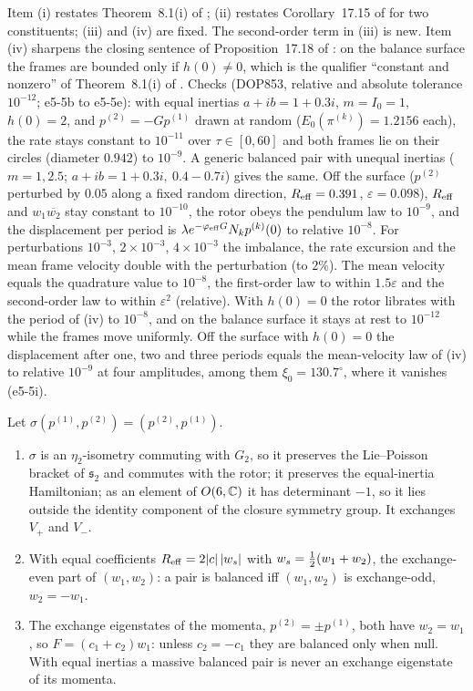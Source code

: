 Item (i) restates Theorem~8.1(i) of \cite{RE}; (ii) restates Corollary~17.15 of \cite{ES17} for two constituents; (iii) and (iv) are fixed. The
second-order term in (iii) is new. Item (iv) sharpens the closing sentence of Proposition~17.18 of \cite{ES17}: on the balance surface the frames are
bounded only if $h(0)\neq0$, which is the qualifier ``constant and nonzero'' of Theorem~8.1(i) of \cite{RE}. Checks (DOP853, relative and absolute
tolerance $10^{-12}$; e5-5b to e5-5e): with equal inertias $a+ib=1+0.3i$, $m=I_0=1$, $h(0)=2$, and $p^{(2)}=-Gp^{(1)}$ drawn at random
($E_0(\pi^{(k)})=1.2156$ each), the rate stays constant to $10^{-11}$ over $\tau\in[0,60]$ and both frames lie on their circles (diameter $0.942$) to
$10^{-9}$. A generic balanced pair with unequal inertias ($m=1,2.5$; $a+ib=1+0.3i,\ 0.4-0.7i$) gives the same. Off the surface ($p^{(2)}$ perturbed by
$0.05$ along a fixed random direction, $R_{\rm eff}=0.391$, $\varepsilon=0.098$), $R_{\rm eff}$ and $w_1\overline{w_2}$ stay constant to $10^{-10}$, the
rotor obeys the pendulum law to $10^{-9}$, and the displacement per period is $\lambda e^{-\varphi_{\rm eff}G}N_kp^{(k)}(0)$ to relative $10^{-8}$. For
perturbations $10^{-3}$, $2\times10^{-3}$, $4\times10^{-3}$ the imbalance, the rate excursion and the mean frame velocity double with the perturbation (to
$2\%$). The mean velocity equals the quadrature value to $10^{-8}$, the first-order law to within $1.5\varepsilon$ and the second-order law to within
$\varepsilon^2$ (relative). With $h(0)=0$ the rotor librates with the period of (iv) to $10^{-8}$, and on the balance surface it stays at rest to
$10^{-12}$ while the frames move uniformly. Off the surface with $h(0)=0$ the displacement after one, two and three periods equals
the mean-velocity law of (iv) to relative $10^{-9}$ at four amplitudes, among them $\xi_0=130.7^\circ$, where it vanishes (e5-5i).

\begin{proposition}
\label{e5:prop:exchange}
Let $\sigma(p^{(1)},p^{(2)})=(p^{(2)},p^{(1)})$.
\begin{enumerate}[label=(\roman*),leftmargin=2.2em]
\item $\sigma$ is an $\eta_2$-isometry commuting with $G_2$, so it preserves the Lie--Poisson bracket of $\mathfrak s_2$ and commutes with the rotor; it
preserves the equal-inertia Hamiltonian; as an element of $O(6,\mathbb{C})$ it has determinant $-1$, so it lies outside the identity component of the closure
symmetry group. It exchanges $V_+$ and $V_-$.
\item With equal coefficients $R_{\rm eff}=2|c|\,|w_s|$ with $w_s=\tfrac12(w_1+w_2)$, the exchange-even part of $(w_1,w_2)$: a pair is balanced iff
$(w_1,w_2)$ is exchange-odd, $w_2=-w_1$.
\item The exchange eigenstates of the momenta, $p^{(2)}=\pm p^{(1)}$, both have $w_2=w_1$, so $F=(c_1+c_2)w_1$: unless $c_2=-c_1$ they are
balanced only when null. With equal inertias a massive balanced pair is never an exchange eigenstate of its momenta.
\end{enumerate}
\end{proposition}


